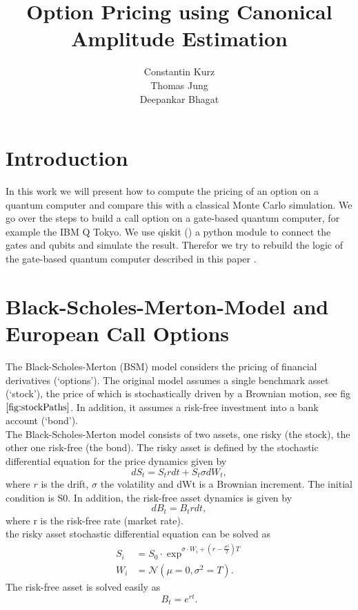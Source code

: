 \documentclass[a4paper, 12pt, one column, aas_macros]{article}
\title{Option Pricing using Canonical Amplitude Estimation}
\author{Constantin Kurz \\ Thomas Jung \\ Deepankar Bhagat}
\begin{document}
\maketitle
\section{Introduction}
In this work we will present how to compute the pricing of an option on a quantum computer and compare this with a classical Monte Carlo simulation.
We go over the steps to build a call option on a gate-based quantum computer, for example the IBM Q Tokyo. We use qiskit (\cite{Qiskit}) a python module to connect the gates and qubits and simulate the result.
Therefor we try to rebuild the logic of the gate-based quantum computer described in this paper \cite{1905.02666}.
\section{Black-Scholes-Merton-Model and European Call Options}
The Black-Scholes-Merton (BSM) model considers the pricing of financial derivatives (‘options’). The original model assumes a single benchmark asset (‘stock’), the price of which is stochastically driven by a Brownian motion, see fig $\ref{fig:stockPaths}$. In addition, it assumes a risk-free investment into a bank account (‘bond’).\\
The Black-Scholes-Merton model consists of two assets, one risky (the stock), the other one risk-free (the bond). The risky asset is defined by the stochastic differential equation for the price dynamics given by
\begin{equation}
    dS_t = S_t r dt + S_t \sigma dW_t,
\end{equation}
where $r$ is the drift, $\sigma$ the volatility and dWt is a Brownian increment. The initial condition is S0. In addition, the risk-free asset dynamics is given by
\begin{equation}
   dB_t = B_t r dt, 
\end{equation}
where r is the risk-free rate (market rate).\\
the risky asset stochastic differential equation can be solved as
\begin{align}
	   S_i &=S_{0}\cdot\exp^{\sigma \cdot W_i+(r-\frac{\sigma^2}{2})T} \label{eq:S_T} \\
	   W_i &= \mathcal{N}(\mu=0,\sigma^2=T) \label{eq:W_T}.
\end{align}
The risk-free asset is solved easily as
\begin{equation}
    B_t = e^{rt}.
\end{equation}
\end{document}
